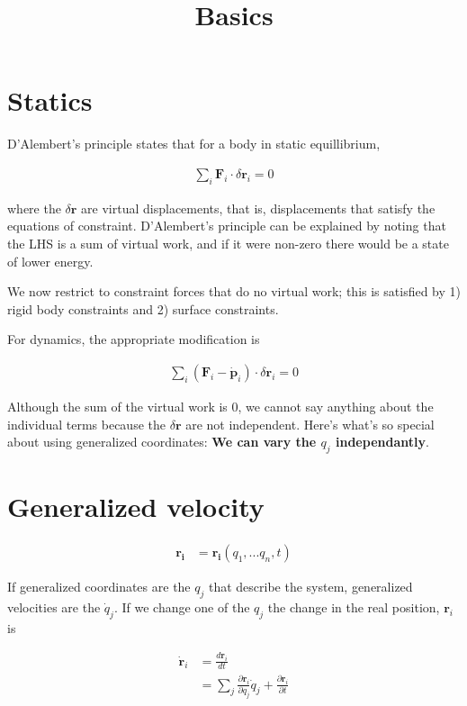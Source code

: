 \documentclass{article}
\title{Basics}
\date{}
\newcommand{\mb}{\mathbf}
\begin{document}
\maketitle

\section{Statics}

D'Alembert's principle states that for a body in static equillibrium,

\begin{align}
\sum_i\mb{F}_i \cdot \delta\mb{r}_i = 0
\end{align}

where the $\delta\mb{r}$ are virtual displacements, that is, displacements that satisfy the equations of constraint. D'Alembert's principle can be explained by noting that the LHS is a sum of virtual work, and if it were non-zero there would be a state of lower energy.

We now restrict to constraint forces that do no virtual work; this is satisfied by 1) rigid body constraints and 2) surface constraints.

For dynamics, the appropriate modification is

\begin{align}
\sum_i(\mb{F}_i - \mb{\dot{p}}_i) \cdot \delta\mb{r}_i = 0
\end{align}


Although the sum of the virtual work is 0, we cannot say anything about the individual terms because the $\delta\mb{r}$ are not independent. Here's what's so special about using generalized coordinates: {\bf We can vary the $q_j$ independantly}.

\section{Generalized velocity}

\begin{align}
\mb{r_i} &= \mb{r_i}(q_1,...q_n, t)
\end{align}

If generalized coordinates are the $q_j$ that describe the system, generalized velocities are the $\dot{q}_j$. If we change one of the $q_j$ the change in the real position, $\mb{r}_i$ is

\begin{align}
\dot{\mb{r}}_i &= \frac{d \mb{r}_i}{d t} \\
&= \sum_j \frac{\partial \mb{r}_i}{\partial q_j} \dot{q}_j + \frac{\partial \mb{r}_i}{\partial t}
\end{align}
\end{document}
